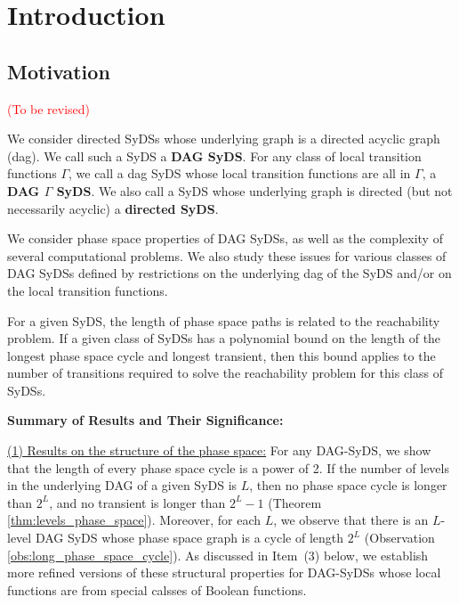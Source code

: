 \section{Introduction}
\label{sec:intro}

\subsection{Motivation}
\label{sse:motivation}

\textcolor{red}{(To be revised)}

We consider directed SyDSs whose underlying graph is a directed
acyclic graph (dag).  We call such a SyDS a {\bf DAG SyDS}.  For
any class of local transition functions $\Gamma$, we call a dag
SyDS whose local transition functions are all in  $\Gamma$, a {\bf
DAG $\Gamma$ SyDS}.  We also call a SyDS whose underlying graph is
directed (but not necessarily acyclic) a {\bf directed SyDS}.


We consider phase space properties of DAG  SyDSs, as well as the
complexity of several computational problems.  We also study these
issues for various classes of DAG  SyDSs defined by restrictions
on the underlying dag of the SyDS and/or on the local transition
functions.

For a given SyDS, the length of  phase space paths is related to
the reachability problem.  If a given class of SyDSs has a polynomial
bound on the length of the longest phase space cycle and longest
transient, then this bound applies to the number of transitions
required to solve the reachability problem for this class of SyDSs.


\noindent
\textbf{Summary of Results and Their Significance:}

\smallskip

\noindent
\underline{(1) Results on the structure of the phase space:}
For any DAG-SyDS, we show that
the length of every phase space cycle is a power of 2.
If the number of levels in the underlying DAG of a given SyDS is $L$,
then no phase space cycle is longer than $2^L$,
and no transient is longer than $2^L-1$
(Theorem \ref{thm:levels_phase_space}).
Moreover, for each $L$, we observe that
there is an $L$-level DAG SyDS whose phase 
space graph is a cycle of length $2^L$
(Observation \ref{obs:long_phase_space_cycle}).
As discussed in Item~(3) below, we establish more refined versions
of these structural properties 
for DAG-SyDSs whose local functions are from
special calsses of Boolean functions.


